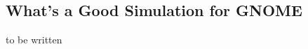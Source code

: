 \documentclass[
12pt, %
a4paper %
]{extreport}
\theoremstyle{plain}
\begin{document}
\subsection{What’s a Good Simulation for GNOME}
to be written
\end{document}
